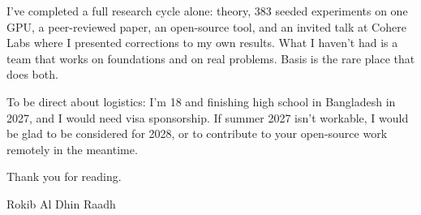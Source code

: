 \documentclass[10pt,a4paper]{article}
\begin{document}
I've completed a full research cycle alone: theory, 383 seeded experiments on one GPU, a peer-reviewed paper, an open-source tool, and an invited talk at Cohere Labs where I presented corrections to my own results. What I haven't had is a team that works on foundations and on real problems. Basis is the rare place that does both.

To be direct about logistics: I'm 18 and finishing high school in Bangladesh in 2027, and I would need visa sponsorship. If summer 2027 isn't workable, I would be glad to be considered for 2028, or to contribute to your open-source work remotely in the meantime.

Thank you for reading.

Rokib Al Dhin Raadh
\end{document}
